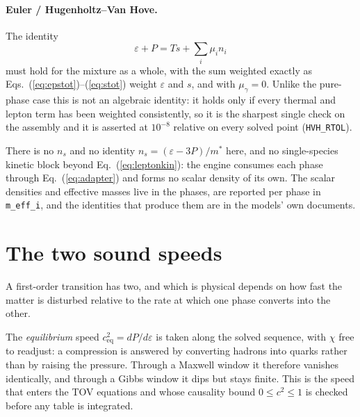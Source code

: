 \documentclass[aps,prc,onecolumn,superscriptaddress,nofootinbib,10pt]{revtex4-2}
\begin{document}
\paragraph{Euler / Hugenholtz--Van Hove.} The identity
%
\begin{equation}
\varepsilon + P = T s + \sum_i \mu_i n_i
\label{eq:euler}
\end{equation}
%
must hold for the mixture as a whole, with the sum weighted exactly as
Eqs.~(\ref{eq:epstot})--(\ref{eq:stot}) weight $\varepsilon$ and $s$, and with
$\mu_\gamma = 0$. Unlike the pure-phase case this is not an algebraic
identity: it holds only if every thermal and lepton term has been weighted
consistently, so it is the sharpest single check on the assembly and it is
asserted at $10^{-8}$ relative on every solved point
(\texttt{HVH\_RTOL}).

There is no $n_s$ and no identity $n_s = (\varepsilon - 3P)/m^*$ here, and no
single-species kinetic block beyond Eq.~(\ref{eq:leptonkin}): the engine
consumes each phase through Eq.~(\ref{eq:adapter}) and forms no scalar density
of its own. The scalar densities and effective masses live in the phases, are
reported per phase in \texttt{m\_eff\_i}, and the identities that produce them
are in the models' own documents.

\section{The two sound speeds}

A first-order transition has two, and which is physical depends on how fast
the matter is disturbed relative to the rate at which one phase converts into
the other.

The \emph{equilibrium} speed $c_{\mathrm{eq}}^2 = dP/d\varepsilon$ is taken
along the solved sequence, with $\chi$ free to readjust: a compression is
answered by converting hadrons into quarks rather than by raising the
pressure. Through a Maxwell window it therefore vanishes identically, and
through a Gibbs window it dips but stays finite. This is the speed that enters
the TOV equations and whose causality bound $0 \le c^2 \le 1$ is checked
before any table is integrated.
\end{document}
